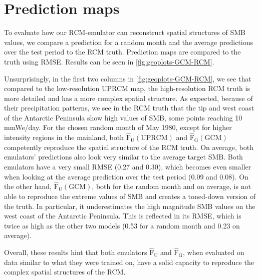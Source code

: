 \documentclass[a4paper,11pt,oneside]{report}
\begin{document}
\section{Prediction maps}\label{subsec:geoplots}
To evaluate how our RCM-emulator can reconstruct spatial structures of SMB values, we compare a prediction for a random month and the average predictions over the test period to the RCM truth. Prediction maps are compared to the truth using RMSE. Results can be seen in \autoref{fig:geoplots-GCM-RCM}. 

Unsurprisingly, in the first two columns in \autoref{fig:geoplots-GCM-RCM}, we see that compared to the low-resolution UPRCM map, the high-resolution RCM truth is more detailed and has a more complex spatial structure. As expected, because of their precipitation patterns, we see in the RCM truth that the tip and west coast of the Antarctic Peninsula show high values of SMB, some points reaching 10 \si{mmWe/day}. For the chosen random month of May 1980, except for higher intensity regions in the mainland, both $\mathrm{\hat{F}_{U}(UPRCM)}$ and $\mathrm{\hat{F}_{G}(GCM)}$ competently reproduce the spatial structure of the RCM truth. On average, both emulators' predictions also look very similar to the average target SMB. Both emulators have a very small RMSE (0.27 and 0.30), which becomes even smaller when looking at the average prediction over the test period (0.09 and 0.08). On the other hand, $\mathrm{\hat{F}_{U}(GCM)}$, both for the random month and on average, is not able to reproduce the extreme values of SMB and creates a toned-down version of the truth. In particular, it underestimates the high magnitude SMB values on the west coast of the Antarctic Peninsula. This is reflected in its RMSE, which is twice as high as the other two models (0.53 for a random month and 0.23 on average). 

Overall, these results hint that both emulators $\mathrm{\hat{F}_{U}}$ and $\mathrm{\hat{F}_{G}}$, when evaluated on data similar to what they were trained on, have a solid capacity to reproduce the complex spatial structures of the RCM. 
\end{document}
